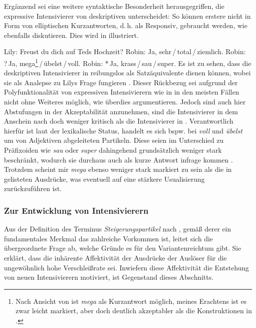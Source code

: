 Ergänzend sei eine weitere syntaktische Besonderheit herausgegriffen, die expressive Intensivierer von deskriptiven unterscheidet: So können erstere nicht in Form von elliptischen Kurzantworten, d.\,h. als Responsiv, gebraucht werden, wie \citet[159]{Gutzmann.2012} ebenfalls diskutieren. Dies wird in  illustriert.

\ea   \label{Responsiv}
\ea Lily: \glqq{}Freust du dich auf Teds Hochzeit?\grqq{} 	\label{freu}
\ex Robin: \glqq{}Ja, sehr\,/\,total\,/\,ziemlich.\grqq{} \label{}	\label{freu1}
\ex Robin: \glqq{}?\,Ja, mega\footnote{Nach Ansicht von \citet[182]{Schmidlin.2015} ist \textit{mega} als Kurzantwort möglich, meines Erachtens ist es zwar leicht markiert, aber doch deutlich akzeptabler als die Konstruktionen in .}\,/\,übelst\,/\,voll.\grqq{}	\label{freu3}
\ex Robin: \glqq{}*\,Ja, krass\,/\,sau\,/\,super.\grqq{}	\label{freu2}
 \z
 \z
Es ist zu sehen, dass die deskriptiven Intensivierer in  reibungslos als Satzäquivalente dienen können, wobei sie als Analepse zu Lilys Frage fungieren \citep[vgl.][56]{Zifonun.1997}. Dieser Rückbezug sei aufgrund der Polyfunktionalität von expressiven Intensivierern wie in  in den meisten Fällen nicht ohne Weiteres möglich, wie \citet[159]{Gutzmann.2012} überdies argumentieren. Jedoch sind auch hier Abstufungen in der Akzeptabilität anzunehmen, sind die Intensivierer in  dem Anschein nach doch weniger kritisch als die Intensivierer in . Verantwortlich hierfür ist laut {\citet[182]{Schmidlin.2015}} der lexikalische Status, handelt es sich bspw. bei \textit{voll} und \textit{übelst} um von Adjektiven abgeleiteten Partikeln. Diese seien im Unterschied zu Präfixoiden wie \textit{sau} oder \textit{super} dahingehend grundsätzlich weniger stark beschränkt, wodurch sie durchaus auch als kurze Antwort infrage kommen {\citep[vgl.][182]{Schmidlin.2015}}. Trotzdem scheint mir \textit{mega} ebenso weniger stark markiert zu sein als die in  gelisteten Ausdrücke, was eventuell auf eine stärkere Usualisierung zurückzuführen ist.

\subsubsection{Zur Entwicklung von Intensivierern} \label{Entwicklung}
Aus der Definition des Terminus \textit{Steigerungspartikel} nach {\citet[650]{Bussmann.2002}}, gemäß derer ein fundamentales Merkmal das zahlreiche Vorkommen ist, leitet sich die übergeordnete Frage ab, welche Gründe es für den Variantenreichtum gibt. Sie erklärt, dass die inhärente Affektivität der Ausdrücke der Auslöser für die \glqq{}ungewöhnlich hohe Verschleißrate\grqq{} sei. Inwiefern diese Affektivität die Entstehung von neuen Intensivierern motiviert, ist Gegenstand dieses Abschnitts.

